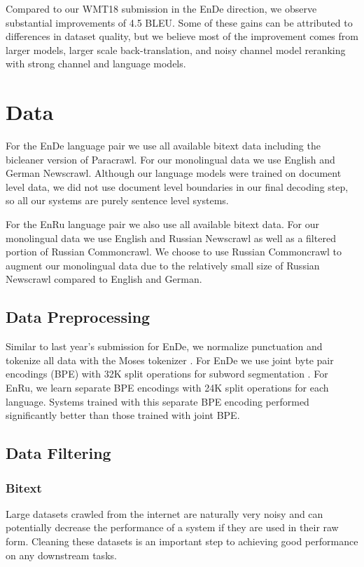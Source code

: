 \documentclass[11pt,a4paper]{article}
\newcommand{\entode}{EnDe}
\newcommand{\enbide}{EnDe}
\newcommand{\enbiru}{EnRu}
\begin{document}
Compared to our WMT18 submission in the \entode{} direction, we observe substantial improvements of 4.5 BLEU.
Some of these gains can be attributed to differences in dataset quality, but we believe most of the improvement comes from larger models, larger scale back-translation, and noisy channel model reranking with strong channel and language models.
 
\section{Data}
For the \enbide{} language pair we use all available bitext data  including the bicleaner version of Paracrawl. 
For our monolingual data we use English and German Newscrawl. 
Although our language models were trained on document level data, we did not use document level boundaries in our final decoding step, so all our systems are purely sentence level systems.

For the \enbiru{} language pair we also use all available bitext data. 
For our monolingual data we use English and Russian Newscrawl as well as a filtered portion of Russian Commoncrawl.
We choose to use Russian Commoncrawl to augment our monolingual data due to the relatively small size of Russian Newscrawl compared to English and German.  

\subsection{Data Preprocessing}
Similar to last year's submission for \entode{}, we normalize punctuation and tokenize all data with the Moses tokenizer \cite{koehn:moses:2007}. 
For \enbide{} we use joint byte pair encodings (BPE) with 32K split operations for subword segmentation \cite{sennrich2016neural}. 
For \enbiru{}, we learn separate BPE encodings with 24K split operations for each language. 
Systems trained with this separate BPE encoding performed significantly better than those trained with joint BPE. 

\subsection{Data Filtering}
\subsubsection{Bitext}
Large datasets crawled from the internet are naturally very noisy and can potentially decrease the performance of a system if they are used in their raw form.
Cleaning these datasets is an important step to achieving good performance on any downstream tasks.
\end{document}
